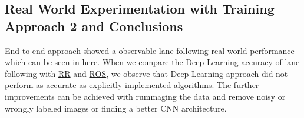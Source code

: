 \documentclass[11pt,letterpaper]{article}
\begin{document}
	\subsection{Real World Experimentation with Training Approach 2 and Conclusions}
	End-to-end approach showed a observable lane following real world performance which can be seen in \href{https://drive.google.com/file/d/1u33WT1eea_rxKjEXIq8q4wmsIBjfPQ2j/view}{here}. When we compare the Deep Learning accuracy of lane following with \href{https://drive.google.com/file/d/1DMLMCO07k4usQVzBTlmiVjwAEVyVyUsn/view}{RR} and \href{https://drive.google.com/file/d/1az6OiYe3fVE5hZonRk_faW_kjZ-aC5JW/view}{ROS}, we observe that Deep Learning approach did not perform as accurate as explicitly implemented algorithms. The further improvements can be achieved with rummaging the data and remove noisy or wrongly labeled images or finding a better CNN architecture.
	
\end{document}
